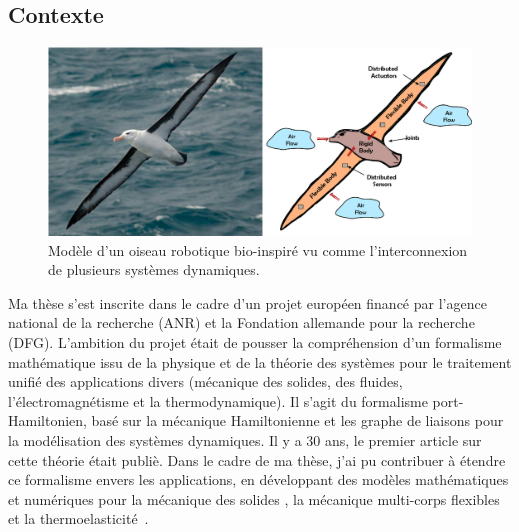 \documentclass[french]{article}
\begin{document}
\subsection{Contexte}

\begin{figure}[tb]
	\centering
	\includegraphics[width = \textwidth]{Bird_Port_Hamiltonian_Subsystems_FULL_ARC.eps}
	\caption{Modèle d'un oiseau robotique bio-inspiré vu comme l'interconnexion de plusieurs systèmes dynamiques. }
	\label{fig:pH_view_bird}
\end{figure}


Ma thèse s'est inscrite dans le cadre d'un projet européen financé par l'agence national de la recherche (ANR) et la Fondation allemande pour la recherche (DFG). L'ambition du projet était de pousser la compréhension d'un formalisme mathématique issu de la physique et de la théorie des systèmes pour le traitement unifié des applications divers (mécanique des solides, des fluides, l'électromagnétisme et la thermodynamique). Il s'agit du formalisme port-Hamiltonien, bas\'e sur la mécanique Hamiltonienne et les graphe de liaisons pour la modélisation des systèmes dynamiques. Il y a 30 ans, le premier article sur cette théorie était publi\`e. Dans le cadre de ma thèse, j'ai pu contribuer \`a étendre ce formalisme envers les applications, en développant des modèles mathématiques et numériques pour la mécanique des solides \cite{brugnoli2019ammmin,brugnoli2019ammkir}, la mécanique multi-corps flexibles~\cite{brugnoli2020msd} et la thermoelasticit\'e~\cite{brugnoli2021ther}. \\
\end{document}
